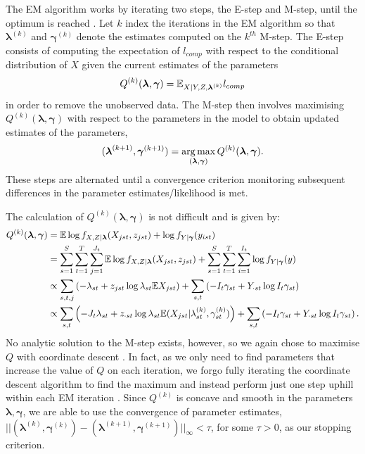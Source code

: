 \documentclass[smallextended]{svjour3}
\begin{document}
The EM algorithm works by iterating two steps, the E-step and M-step, until the optimum is reached \citep{Dempster:1977,McLachlan:2007}.  Let $k$ index the iterations in the EM algorithm so that $\boldsymbol \lambda^{(k)}$ and $\boldsymbol \gamma^{(k)}$ denote the estimates computed on the $k^{th}$ M-step. The E-step consists of computing the expectation of $l_{comp}$ with respect to the conditional distribution of $X$ given the current estimates of the parameters
\[
Q^{(k)}(\boldsymbol{\lambda},\boldsymbol{\gamma}) = \mathbb{E}_{X|Y,Z,\boldsymbol{\lambda}^{(k)}} l_{comp}
\]
in order to remove the unobserved data. The M-step then involves maximising $Q^{(k)}(\boldsymbol{\lambda},\boldsymbol{\gamma})$ with respect to the parameters in the model to obtain updated estimates of the parameters,
\[
(\boldsymbol{\lambda}^{(k+1)}, \boldsymbol{\gamma}^{(k+1)}) = \operatorname*{arg\,max}_{(\boldsymbol{\lambda}, \boldsymbol{\gamma})} Q^{(k)}(\boldsymbol{\lambda}, \boldsymbol{\gamma}).
\]
These steps are alternated until a convergence criterion monitoring subsequent differences in the parameter estimates/likelihood is met.  

The calculation of $Q^{(k)}(\boldsymbol{\lambda}, \boldsymbol{\gamma})$ is not difficult and is given by:
\begin{align}
  \label{eq:estep}
  \begin{split}
  Q^{(k)}(\boldsymbol{\lambda}, \boldsymbol{\gamma})
  & = \mathbb{E} \log{f_{X,Z|\boldsymbol{\lambda}}(X_{jst},z_{jst})} + \log{f_{Y|\boldsymbol{\gamma}}(y_{ist})} \\
  & = \sum_{s=1}^S \sum_{t=1}^T \sum_{j=1}^{J_t} \mathbb{E} \log{f_{X,Z|\boldsymbol{\lambda}}(X_{jst},z_{jst})}
  + \sum_{s=1}^S \sum_{t=1}^T \sum_{i=1}^{I_t} \log{f_{Y|\boldsymbol{\gamma}}(y)} \\
  & \propto \sum_{s,t,j} \left( - \lambda_{st} 
    + z_{jst} \log{\lambda_{st}} \mathbb{E} X_{jst} \right) + \sum_{s,t} \left( -I_t \gamma_{st} + Y_{\cdot st} \log{I_t \gamma_{st}} \right) \\
  & \propto \sum_{s,t} \left( -J_t \lambda_{st} + z_{\cdot st} \log{\lambda_{st}} \mathbb{E} (X_{jst}|\lambda_{st}^{(k)},\gamma_{st}^{(k)}) \right) + \sum_{s,t} \left( -I_t \gamma_{st} + Y_{\cdot st} \log{I_t \gamma_{st}} \right).
\end{split}
\end{align}
\noindent No analytic solution to the M-step exists, however, so we again chose to maximise $Q$ with coordinate descent \citep{Luo:1992}.  In fact, as we only need to find parameters that increase the value of $Q$ on each iteration, we forgo fully iterating the coordinate descent algorithm to find the maximum and instead perform just one step uphill within each EM iteration \citep{Givens:2012}.  Since $Q^{(k)}$ is concave and smooth in the parameters $\boldsymbol{\lambda}, \boldsymbol{\gamma}$, we are able to use the convergence of parameter estimates, $||(\boldsymbol{\lambda}^{(k)}, \boldsymbol{\gamma}^{(k)}) - (\boldsymbol{\lambda}^{(k+1)}, \boldsymbol{\gamma}^{(k+1)})||_{\infty} < \tau $, for some $\tau>0$, as our stopping criterion.
\end{document}

